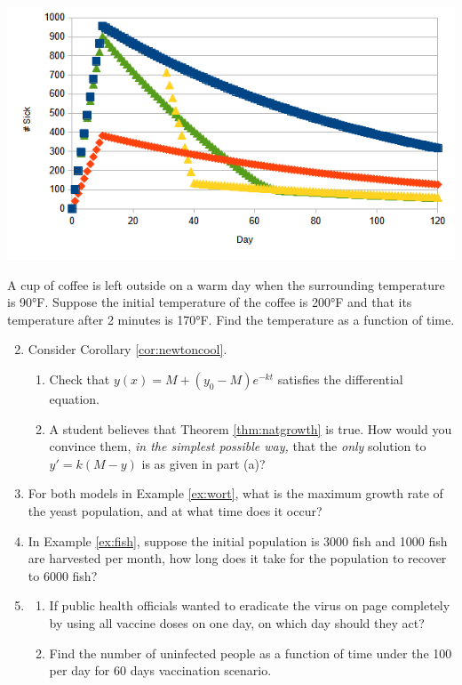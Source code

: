 \begin{center}
	\includegraphics[scale=0.69]{vax-new}
\end{center}

\goodbreak


\begin{exercises}
	\exstart A cup of coffee is left outside on a warm day when the surrounding temperature is \ang{90}F. Suppose the initial temperature of the coffee is \ang{200}F and that its temperature after 2 minutes is \ang{170}F. Find the temperature as a function of time.
	
	\begin{enumerate}\setcounter{enumi}{1}
	  \item Consider Corollary \ref{cor:newtoncool}.
		\begin{enumerate}
		  \item Check that $y(x)=M+(y_0-M)e^{-kt}$ satisfies the differential equation.
		  \item A student believes that Theorem \ref{thm:natgrowth} is true. How would you convince them, \emph{in the simplest possible way,} that the \emph{only} solution to $y'=k(M-y)$ is as given in part (a)?
		\end{enumerate}
		
		\item For both models in Example \ref{ex:wort}, what is the maximum growth rate of the yeast population, and at what time does it occur?
	
	
		\item In Example \ref{ex:fish}, suppose the initial population is 3000 fish and 1000 fish are harvested per month, how long does it take for the population to recover to 6000 fish?
		
		\item\begin{enumerate}
		  \item If public health officials wanted to eradicate the virus on page \pageref{pg:virus} completely by using all vaccine doses on one day, on which day should they act?
		  \item Find the number of uninfected people as a function of time under the 100 per day for 60 days vaccination scenario.
		\end{enumerate}
	\end{enumerate}
\end{exercises}
